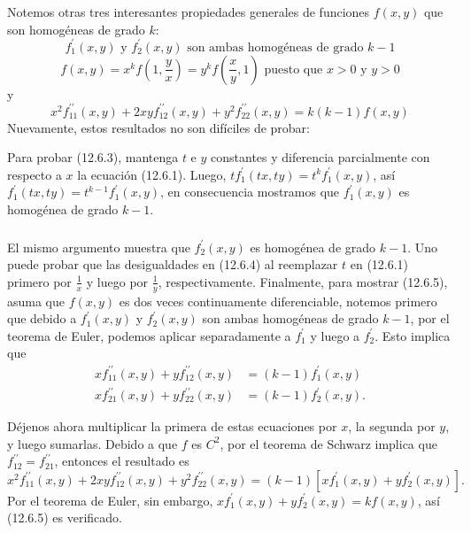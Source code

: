 \begin{frame}[t]
\frametitle{\secname}
Notemos otras tres interesantes propiedades generales de funciones $f\left(x,y\right)$ que son homogéneas de grado $k$:
\begin{equation}
f^{\prime}_{1}\left(x,y\right)\text{ y }f^{\prime}_{2}\left(x,y\right)\text{ son ambas homogéneas de grado }k-1
\end{equation}
\begin{equation}
f\left(x,y\right)=x^{k}f\left(1,\frac{y}{x}\right)=y^{k}f\left(\frac{x}{y},1\right)\text{ puesto que }x>0\text{ y }y>0
\end{equation}
y
\begin{equation}
x^{2}f^{\prime\prime}_{11}\left(x,y\right)+2xyf^{\prime\prime}_{12}\left(x,y\right)+y^{2}f^{\prime\prime}_{22}\left(x,y\right)=k\left(k-1\right)f\left(x,y\right)
\end{equation}
Nuevamente, estos resultados no son difíciles de probar:

Para probar (12.6.3), mantenga $t$ e $y$ constantes y diferencia parcialmente con respecto a $x$ la ecuación (12.6.1). Luego, $tf^{\prime}_{1}\left(tx,ty\right)=t^{k}f^{\prime}_{1}\left(x,y\right)$, así $f^{\prime}_{1}\left(tx,ty\right)=t^{k-1}f^{\prime}_{1}\left(x,y\right)$, en consecuencia mostramos que $f^{\prime}_{1}\left(x,y\right)$ es homogénea de grado $k-1$. 
\end{frame}

\begin{frame}[t]
\frametitle{\secname}
El mismo argumento muestra que $f^{\prime}_{2}\left(x,y\right)$ es homogénea de grado $k-1$. Uno puede probar que las desigualdades en (12.6.4) al reemplazar $t$ en (12.6.1) primero por $\frac{1}{x}$ y luego por $\frac{1}{y}$, respectivamente. Finalmente, para mostrar (12.6.5), asuma que $f\left(x,y\right)$ es dos veces continuamente diferenciable, notemos primero que debido a $f^{\prime}_{1}\left(x,y\right)$ y $f^{\prime}_{2}\left(x,y\right)$ son ambas homogéneas de grado $k-1$, por el teorema de Euler, podemos aplicar separadamente a $f^{\prime}_{1}$ y luego a $f^{\prime}_{2}$. Esto implica que
\begin{align}
xf^{\prime\prime}_{11}\left(x,y\right)+yf^{\prime\prime}_{12}\left(x,y\right)&=\left(k-1\right)f^{\prime}_{1}\left(x,y\right)\\
xf^{\prime\prime}_{21}\left(x,y\right)+yf^{\prime\prime}_{22}\left(x,y\right)&=\left(k-1\right)f^{\prime}_{2}\left(x,y\right).
\end{align}

Déjenos ahora multiplicar la primera de estas ecuaciones por $x$, la segunda por $y$, y luego sumarlas. Debido a que $f$ es $C^{2}$, por el teorema de Schwarz implica que $f^{\prime\prime}_{12}=f^{\prime\prime}_{21}$, entonces el resultado es \[ x^{2}f^{\prime\prime}_{11}\left(x,y\right)+2xyf^{\prime\prime}_{12}\left(x,y\right)+y^{2}f^{\prime\prime}_{22}\left(x,y\right)=\left(k-1\right)\left[xf^{\prime}_{1}\left(x,y\right)+yf^{\prime}_{2}\left(x,y\right)\right]. \] Por el teorema de Euler, sin embargo, $xf^{\prime}_{1}\left(x,y\right)+yf^{\prime}_{2}\left(x,y\right)=kf\left(x,y\right)$, así (12.6.5) es verificado.
\end{frame}

